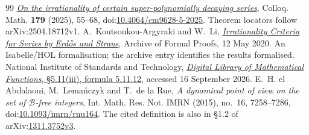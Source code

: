 \begin{thebibliography}{99}
  \href{https://arxiv.org/abs/2504.18712v1}
  {\emph{On the irrationality of certain super-polynomially decaying series}},
  Colloq. Math. \textbf{179} (2025), 55--68,
  doi:\href{https://doi.org/10.4064/cm9628-5-2025}{10.4064/cm9628-5-2025}.
  Theorem locators follow arXiv:2504.18712v1.
 A.~Koutsoukou-Argyraki and W.~Li,
  \href{https://isa-afp.org/entries/Irrational_Series_Erdos_Straus.html}
  {\emph{Irrationality Criteria for Series by Erd\H{o}s and Straus}},
  Archive of Formal Proofs, 12 May 2020. An Isabelle/HOL formalisation;
  the archive entry identifies the results formalised.
 National Institute of Standards and Technology,
  \href{https://dlmf.nist.gov/5.11.E12}{\emph{Digital Library of Mathematical
  Functions}, \S5.11(iii), formula 5.11.12}, accessed 16 September 2026.
 E.~H. el Abdalaoui, M.~Lema\'nczyk and T.~de la Rue,
  \emph{A dynamical point of view on the set of $\mathcal B$-free integers},
  Int. Math. Res. Not. IMRN (2015), no.~16, 7258--7286,
  doi:\href{https://doi.org/10.1093/imrn/rnu164}{10.1093/imrn/rnu164}.
  The cited definition is also in \S1.2 of
  arXiv:\href{https://arxiv.org/abs/1311.3752v3}{1311.3752v3}.
\end{thebibliography}
